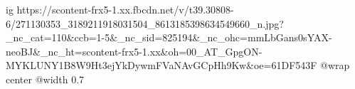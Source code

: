  
 
 
 
 

\ifcmt
  ig https://scontent-frx5-1.xx.fbcdn.net/v/t39.30808-6/271130353_3189211918031504_8613185398634549660_n.jpg?_nc_cat=110&ccb=1-5&_nc_sid=825194&_nc_ohc=mmLbGans0sYAX-neoBJ&_nc_ht=scontent-frx5-1.xx&oh=00_AT_GpgON-MYKLUNY1B8W9Ht3ejYkDywmFVaNAvGCpHh9Kw&oe=61DF543F
	@wrap center
	@width 0.7
\fi
